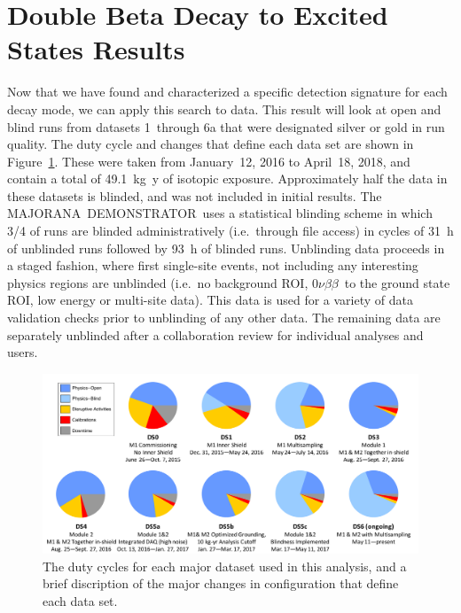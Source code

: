 \documentclass[notitlepage,rmp,aps,10pt]{revtex4-1}
\newcommand{\MJ}{M{\footnotesize AJORANA}}
\newcommand{\Demo}{D{\footnotesize EMON\-STRAT\-OR}}
\newcommand{\MJD}{\MJ\ \Demo}
\newcommand{\znbb}{${0 \nu \beta \beta}$}
\begin{document}
\section{Double Beta Decay to Excited States Results}
Now that we have found and characterized a specific detection signature for each decay mode, we can apply this search to data.
This result will look at open and blind runs from datasets 1~through 6a that were designated silver or gold in run quality.
The duty cycle and changes that define each data set are shown in Figure~\ref{fig:dutycycle}.
These were taken from January~12, 2016 to April~18, 2018, and contain a total of 49.1~kg~y of isotopic exposure.
Approximately half the data in these datasets is blinded, and was not included in initial results.
The \MJD\ uses a statistical blinding scheme in which 3/4 of runs are blinded administratively (i.e.~through file access) in cycles of 31~h of unblinded runs followed by 93~h of blinded runs.
Unblinding data proceeds in a staged fashion, where first single-site events, not including any interesting physics regions are unblinded (i.e.~no background ROI, \znbb\ to the ground state ROI, low energy or multi-site data).
This data is used for a variety of data validation checks prior to unblinding of any other data.
The remaining data are separately unblinded after a collaboration review for individual analyses and users.

\begin{figure}[h]
  \centering
  \includegraphics[width=0.9\linewidth]{dutycycle}
  \caption[Dataset and Duty Cycle Summary]{\label{fig:dutycycle}
    The duty cycles for each major dataset used in this analysis, and a brief discription of the major changes in configuration that define each data set.
  }
\end{figure}
\end{document}
